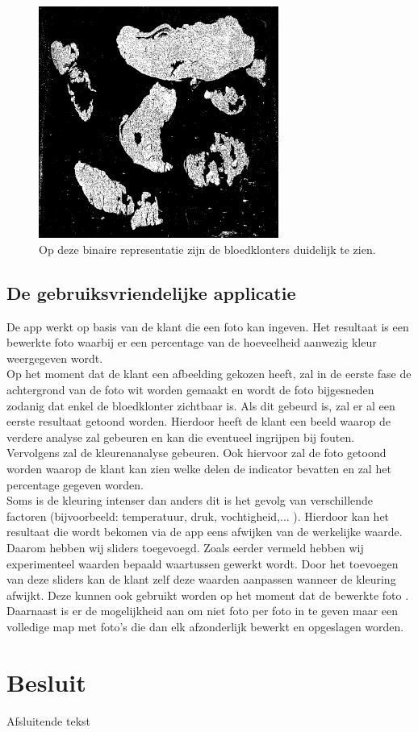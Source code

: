 \documentclass[a4paper,kulak]{kulakarticle}
\begin{document}
	\begin{figure}[H]
		\centering
		\includegraphics[width=0.7\textwidth]{grijswaarden_bin_vb}
		\caption{Op deze binaire representatie zijn de bloedklonters duidelijk te zien.}
		\label{figuur foto_bin}
	\end{figure}


\subsection{De gebruiksvriendelijke applicatie}
De app werkt op basis van de klant die een foto kan ingeven. Het resultaat is een bewerkte foto waarbij er een percentage van de hoeveelheid aanwezig kleur weergegeven wordt.\\
Op het moment dat de klant een afbeelding gekozen heeft, zal  in de eerste fase de achtergrond van de foto wit worden gemaakt en wordt de foto bijgesneden zodanig dat enkel de bloedklonter zichtbaar is. Als dit gebeurd is, zal er al een eerste resultaat getoond worden. Hierdoor heeft de klant een beeld waarop de verdere analyse zal gebeuren en kan die eventueel ingrijpen bij fouten. \\
Vervolgens zal de kleurenanalyse gebeuren. Ook hiervoor zal de foto getoond worden waarop de klant kan zien welke delen de indicator bevatten en zal het percentage gegeven worden. \\
Soms is de kleuring intenser dan anders dit is het gevolg van verschillende factoren (bijvoorbeeld: temperatuur, druk, vochtigheid,... ). Hierdoor kan het resultaat die wordt bekomen via de app eens afwijken van de werkelijke waarde. Daarom hebben wij sliders toegevoegd. Zoals eerder vermeld hebben wij experimenteel waarden bepaald waartussen gewerkt wordt. Door het toevoegen van deze sliders kan de klant zelf deze waarden aanpassen wanneer de kleuring afwijkt. Deze kunnen ook gebruikt worden op het moment dat de bewerkte foto .
Daarnaast is er de mogelijkheid aan om niet foto per foto in te geven maar een volledige map met foto's die dan elk afzonderlijk bewerkt en opgeslagen worden.

\section*{Besluit}

Afsluitende tekst


\end{document}
